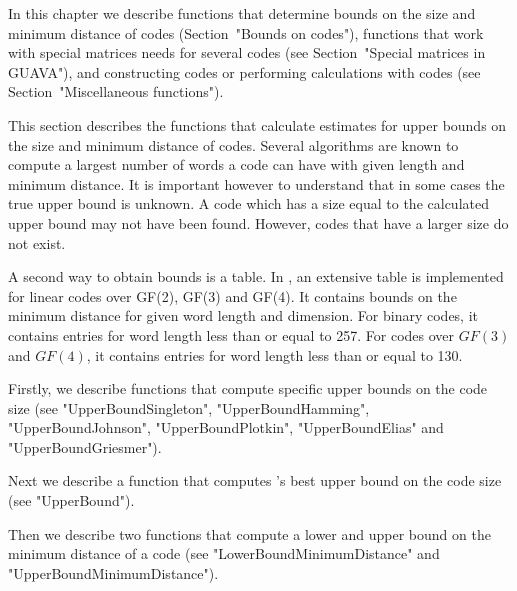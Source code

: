 %
%
%
%

In this chapter we describe functions that determine bounds on  the  size
and minimum distance of codes (Section~"Bounds on codes"), functions that
work  with  special  matrices  {\GUAVA}  needs  for  several  codes  (see
Section~"Special  matrices  in  GUAVA"),  and   constructing   codes   or
performing   calculations   with   codes   (see    Section~"Miscellaneous
functions").


This  section describes the functions  that calculate estimates for upper
bounds on the size and minimum distance  of codes. Several algorithms are
known to compute a largest  number of words a   code can have with  given
length and  minimum distance. It is important  however to understand that
in some cases the true  upper bound is unknown.  A code which has a  size
equal to  the calculated upper bound may  not  have been found.  However,
codes that have a larger size do not exist.

A second way to obtain bounds is a table. In {\GUAVA}, an extensive table
is implemented for linear codes over  GF(2), GF(3) and GF(4). It contains
bounds on the minimum distance for given  word length and dimension.  For
binary codes, it contains  entries for word  length less than or equal to
257. For  codes over $GF(3)$  and  $GF(4)$, it contains entries  for word
length less than or equal to 130.

Firstly, we describe functions that compute specific upper bounds on  the
code    size     (see     "UpperBoundSingleton",     "UpperBoundHamming",
"UpperBoundJohnson",    "UpperBoundPlotkin",    "UpperBoundElias"     and
"UpperBoundGriesmer").

Next we describe a function that computes {\GUAVA}'s best upper bound  on
the code size (see "UpperBound").

Then we describe two functions that compute a lower and  upper  bound  on
the minimum distance  of  a  code  (see  "LowerBoundMinimumDistance"  and
"UpperBoundMinimumDistance").

